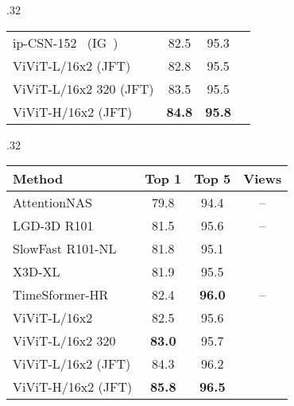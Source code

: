 \documentclass[10pt,twocolumn,letterpaper]{article}
\begin{document}
\begin{table*}[tb]
\begin{subtable}[t]{.32\linewidth}
{\begin{tabular}{lccc}
				ip-CSN-152~\cite{tran_iccv_2019} (IG~\cite{mahajan_eccv_2018}) 			  &  82.5					& 95.3			&  	  \\
				ViViT-L/16x2 (JFT) 													 &  82.8				 & 95.5	&   \\  ViViT-L/16x2 320 (JFT) 											  & 83.5	 & 95.5 &  \\ ViViT-H/16x2 (JFT) 													&  \textbf{84.8} &  \textbf{95.8} 	&  \\  \bottomrule
			\end{tabular}
		}
		\label{tab:sota_kinetics400}
	\end{subtable}
  	\hfill
  	\begin{subtable}[t]{.32\linewidth}
		\centering
  		\caption{Kinetics 600}
  		\setlength{\tabcolsep}{4pt} \vspace{-0.3\baselineskip}
  		\scriptsize{
	  		\begin{tabular}{lccc}
	  			\toprule
	  			Method 																			 & Top 1                & Top 5             & Views \\
	  			\midrule
	  			AttentionNAS~\cite{wang_nas_eccv_2020}						  &  79.8				   & 94.4  & -- \\
	  			LGD-3D R101~\cite{qiu_lgd_cvpr_2019}							&  81.5				    & 95.6				&  --						\\  
	  			SlowFast R101-NL~\cite{feichtenhofer_iccv_2019}       		&  81.8                     &  95.1               &        \\
	  			X3D-XL~\cite{feichtenhofer_cvpr_2020}      						 &  81.9					&  95.5				&        \\
	  			TimeSformer-HR~\cite{bertasius_arxiv_2021}					  & 82.4				& \textbf{96.0}					& -- \\
	  			ViViT-L/16x2 													   & 	82.5					& 95.6  &   \\  ViViT-L/16x2  320 												  & \textbf{83.0} &  95.7  &  \\  \midrule
	  			ViViT-L/16x2 (JFT) 													 & 84.3 & 96.2 &   \\ ViViT-H/16x2 (JFT) 													& \textbf{85.8} & \textbf{96.5} &  \\ \bottomrule
	  		\end{tabular}
	  		\label{tab:sota_kinetics600}
  		}
  		\vspace{0.35\baselineskip} \centering
  		\caption{Moments in Time}
  		\vspace{-0.3\baselineskip}
  		\setlength{\tabcolsep}{6pt} \scriptsize{
  			\begin{tabular}{lcc}
  				\toprule

\end{tabular}}
\end{subtable}
\end{table*}
\end{document}
